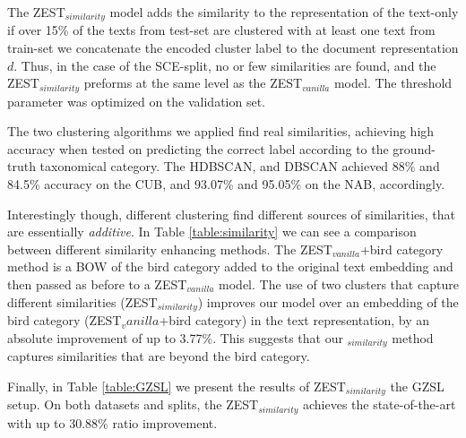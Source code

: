 \documentclass[11pt,a4paper]{article}
\newcommand\yuval[1]{\textcolor{darkpink}{\textbf{YUVAL:} #1 }}
\newcommand\reut[1]{\textcolor{green}{\textbf{REUT:} #1 }}
\begin{document}
The ZEST$_{similarity}$ model adds the similarity to the representation of the text-only if over 15\% of the texts from test-set are clustered with at least one text from train-set we concatenate the encoded cluster label to the document representation $d$.
Thus, in the case of the SCE-split, no or few similarities are found, and the ZEST$_{similarity}$ preforms at the same level as the ZEST$_{vanilla}$ model. %
The threshold parameter was optimized on the validation set. 




The two clustering algorithms we applied find real similarities, achieving high accuracy when tested on predicting the correct label according to the ground-truth taxonomical category. The HDBSCAN, and DBSCAN achieved 88\% and 84.5\% accuracy on the CUB, and 93.07\% and 95.05\% on the NAB, accordingly.

Interestingly though, different clustering find different sources of similarities, that are essentially {\em additive}. In Table \ref{table:similarity} we can see a comparison between different similarity enhancing methods. 
The ZEST$_{vanilla}$+bird category method is a BOW of the bird category added to the original text embedding and then passed as before to a ZEST$_{vanilla}$ model. 
The use of two clusters that capture different similarities (ZEST$_{similarity}$) improves our model over an embedding of the bird category (ZEST$_vanilla$+bird category) in the text representation, by an absolute improvement of up to 3.77\%. This suggests that our $_{similarity}$ method captures similarities that are beyond the bird category. %

Finally, 
in Table \ref{table:GZSL} we present the results of ZEST$_{similarity}$ the GZSL setup. On both datasets and splits, the ZEST$_{similarity}$ achieves the state-of-the-art with up to 30.88\% ratio improvement.
\end{document}
